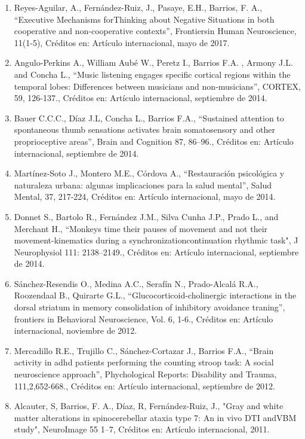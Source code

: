 \begin{enumerate}
\item Reyes-Aguilar, A., Fernández-Ruiz, J., Pasaye, E.H., Barrios, F. A., “Executive Mechanisms forThinking about Negative 
Situations in both cooperative and non-cooperative contexts”, Frontiersin Human Neuroscience, 11(1-5), Créditos en: 
Artículo internacional, mayo de 2017.

\item Angulo-Perkins A., William Aubé W., Peretz I., Barrios F.A. , Armony J.L. and Concha L., “Music listening engages 
specific cortical regions within the temporal lobes: Differences between musicians and non-musicians”, CORTEX, 59, 
126-137., Créditos en: Artículo internacional, septiembre de 2014.

\item Bauer C.C.C., Díaz J.L, Concha L., Barrios F.A., “Sustained attention to spontaneous thumb sensations activates brain 
somatosensory and other proprioceptive areas”, Brain and Cognition 87, 86–96., Créditos en: Artículo internacional, 
septiembre de 2014.

\item Martínez-Soto J., Montero M.E., Córdova A., “Restauración psicológica y naturaleza urbana: algunas implicaciones para 
la salud mental”, Salud Mental, 37, 217-224, Créditos en: Artículo internacional, mayo de 2014.

\item Donnet S., Bartolo R., Fernández J.M., Silva Cunha J.P., Prado L., and Merchant H., “Monkeys time their pauses of 
movement and not their movement-kinematics during a synchronizationcontinuation rhythmic task", J Neurophysiol 111: 
2138–2149., Créditos en: Artículo internacional, septiembre de 2014.

\item Sánchez-Resendis O., Medina A.C., Serafín N., Prado-Alcalá R.A., Roozendaal B., Quirarte G.L., 
“Glucocorticoid-cholinergic interactions in the dorsal striatum in memory consolidation of inhibitory avoidance traning”, 
frontiers in Behavioral Neuroscience, Vol. 6, 1-6., Créditos en: Artículo internacional, noviembre de 2012.

\item Mercadillo R.E., Trujillo C., Sánchez-Cortazar J., Barrios F.A., “Brain activity in adhd patients performing the 
counting stroop task: A social neuroscience approach”, Phychological Reports: Disability and Trauma, 111,2,652-668., 
Créditos en: Artículo internacional, septiembre de 2012.

\item Alcauter, S, Barrios, F. A., Díaz, R, Fernández-Ruiz, J., "Gray and white matter alterations in spinocerebellar 
ataxia 
type 7: An in vivo DTI andVBM study", NeuroImage 55 1–7, Créditos en: Artículo internacional, 2011.


\end{enumerate}
